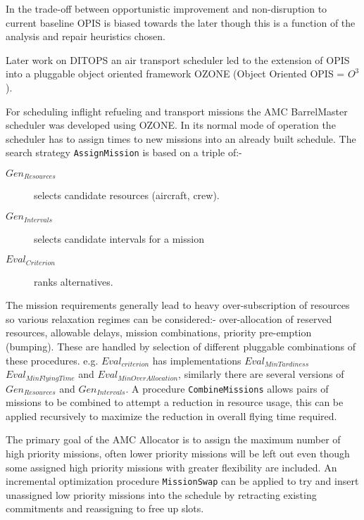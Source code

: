 In the trade-off between opportunistic improvement and non-disruption to current baseline OPIS is biased towards the later though this is a function of the analysis and repair heuristics chosen.%


Later work on DITOPS \citep{smith96mixed, smith94toward} an air transport scheduler led to the extension of OPIS into a pluggable object oriented framework OZONE (Object Oriented OPIS = $O^3$). %

For scheduling inflight refueling and transport missions the AMC BarrelMaster scheduler \citep{smith04continuous} was developed using OZONE. In its normal mode of operation the scheduler has to assign times to new missions into an already built schedule. The search strategy \texttt{AssignMission} is based on a triple of:-
\begin{description}
\item[$Gen_{Resources}$] selects candidate resources (aircraft, crew).
\item[$Gen_{Intervals}$] selects candidate intervals for a mission
\item[$Eval_{Criterion}$] ranks alternatives.
\end{description}

The mission requirements generally lead to heavy over-subscription of resources so various relaxation regimes can be considered:- over-allocation of reserved resources, allowable delays, mission combinations, priority pre-emption (bumping). These are handled by selection of different pluggable combinations of these procedures. e.g. $Eval_{criterion}$ has implementations $Eval_{MinTardiness}$ $Eval_{MinFlyingTime}$ and $Eval_{MinOverAllocation}$, similarly there are several versions of $Gen_{Resources}$ and $Gen_{Intervals}$. A procedure \texttt{CombineMissions} allows pairs of missions to be combined to attempt a reduction in resource usage, this can be applied recursively to maximize the reduction in overall flying time required. 

The primary goal of the AMC Allocator is to assign the maximum number of high priority missions, often lower priority missions will be left out even though some assigned high priority missions with greater flexibility are included. An incremental optimization procedure \texttt{MissionSwap} can be applied to try and insert unassigned low priority missions into the schedule by retracting existing commitments and reassigning to free up slots. 

